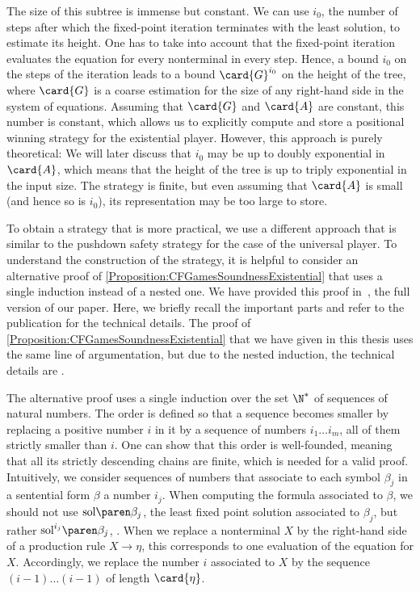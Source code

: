 \documentclass[../../diss.tex]{subfiles}
\begin{document}
The size of this subtree is immense but constant.
We can use $i_0$, the number of steps after which the fixed-point iteration terminates with the least solution, to estimate its height.
One has to take into account that the fixed-point iteration evaluates the equation for every nonterminal in every step.
Hence, a bound $i_0$ on the steps of the iteration leads to a bound $\card{G}^{i_0}$ on the height of the tree, where $\card{G}$ is a coarse estimation for the size of any right-hand side in the system of equations.
Assuming that $\card{G}$ and $\card{A}$ are constant, this number is constant, which allows us to explicitly compute and store a positional winning strategy for the existential player.
However, this approach is purely theoretical:
We will later discuss that $i_0$ may be up to doubly exponential in $\card{A}$, which means that the height of the tree is up to triply exponential in the input size.
The strategy is finite, but even assuming that $\card{A}$ is small (and hence so is $i_0$), its representation may be too large to store.

To obtain a strategy that is more practical, we use a different approach that is similar to the pushdown safety strategy for the case of the universal player.
To understand the construction of the strategy, it is helpful to consider an alternative proof of \cref{Proposition:CFGamesSoundnessExistential} that uses a single induction instead of a nested one.
We have provided this proof in~\cite{HolikMM16a}, the full version of our paper.
Here, we briefly recall the important parts and refer to the publication for the technical details.
The proof of \cref{Proposition:CFGamesSoundnessExistential} that we have given in this thesis uses the same line of argumentation, but due to the nested induction, the technical details are .

The alternative proof uses a single induction over the set $\N^*$ of sequences of natural numbers.
The order is defined so that a sequence becomes smaller by replacing a positive number $i$ in it by a sequence of numbers $i_1 \ldots i_m$, all of them strictly smaller than $i$.
One can show that this order is well-founded, meaning that all its strictly descending chains are finite, which is needed for a valid proof.
Intuitively, we consider sequences of numbers that associate to each symbol $\beta_j$ in a sentential form $\beta$ a number $i_j$.
When computing the formula associated to $\beta$, we should not use $\sol{\beta_j}$, the least fixed point solution associated to $\beta_j$, but rather $\sol{i_j}{\beta_j}$, .
When we replace a nonterminal $X$ by the right-hand side of a production rule $X \to \eta$, this corresponds to one evaluation of the equation for $X$.
Accordingly, we replace the number $i$ associated to $X$ by the sequence $(i-1) \ldots (i-1)$ of length $\card{\eta}$.
\end{document}
